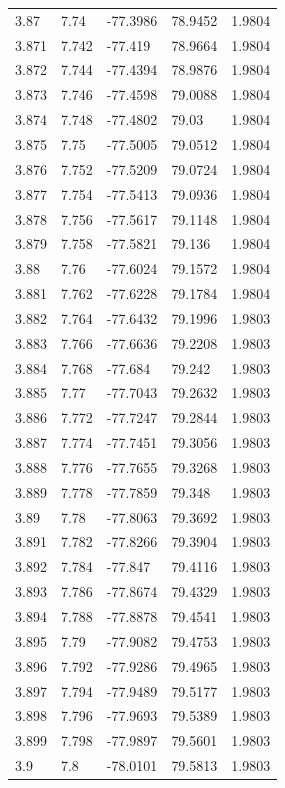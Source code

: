 \begin{tabular}{lllll}
3.87 & 7.74 & -77.3986 & 78.9452 & 1.9804 \\
3.871 & 7.742 & -77.419 & 78.9664 & 1.9804 \\
3.872 & 7.744 & -77.4394 & 78.9876 & 1.9804 \\
3.873 & 7.746 & -77.4598 & 79.0088 & 1.9804 \\
3.874 & 7.748 & -77.4802 & 79.03 & 1.9804 \\
3.875 & 7.75 & -77.5005 & 79.0512 & 1.9804 \\
3.876 & 7.752 & -77.5209 & 79.0724 & 1.9804 \\
3.877 & 7.754 & -77.5413 & 79.0936 & 1.9804 \\
3.878 & 7.756 & -77.5617 & 79.1148 & 1.9804 \\
3.879 & 7.758 & -77.5821 & 79.136 & 1.9804 \\
3.88 & 7.76 & -77.6024 & 79.1572 & 1.9804 \\
3.881 & 7.762 & -77.6228 & 79.1784 & 1.9804 \\
3.882 & 7.764 & -77.6432 & 79.1996 & 1.9803 \\
3.883 & 7.766 & -77.6636 & 79.2208 & 1.9803 \\
3.884 & 7.768 & -77.684 & 79.242 & 1.9803 \\
3.885 & 7.77 & -77.7043 & 79.2632 & 1.9803 \\
3.886 & 7.772 & -77.7247 & 79.2844 & 1.9803 \\
3.887 & 7.774 & -77.7451 & 79.3056 & 1.9803 \\
3.888 & 7.776 & -77.7655 & 79.3268 & 1.9803 \\
3.889 & 7.778 & -77.7859 & 79.348 & 1.9803 \\
3.89 & 7.78 & -77.8063 & 79.3692 & 1.9803 \\
3.891 & 7.782 & -77.8266 & 79.3904 & 1.9803 \\
3.892 & 7.784 & -77.847 & 79.4116 & 1.9803 \\
3.893 & 7.786 & -77.8674 & 79.4329 & 1.9803 \\
3.894 & 7.788 & -77.8878 & 79.4541 & 1.9803 \\
3.895 & 7.79 & -77.9082 & 79.4753 & 1.9803 \\
3.896 & 7.792 & -77.9286 & 79.4965 & 1.9803 \\
3.897 & 7.794 & -77.9489 & 79.5177 & 1.9803 \\
3.898 & 7.796 & -77.9693 & 79.5389 & 1.9803 \\
3.899 & 7.798 & -77.9897 & 79.5601 & 1.9803 \\
3.9 & 7.8 & -78.0101 & 79.5813 & 1.9803 \\

\end{tabular}
